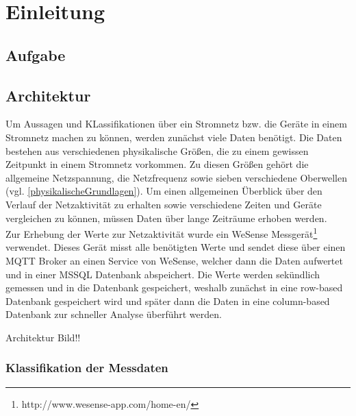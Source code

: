 \chapter{Einleitung}

\section{Aufgabe}

\section{Architektur}

    Um Aussagen und KLassifikationen über ein Stromnetz bzw. die Geräte in einem Stromnetz machen zu können, werden zunächst viele Daten benötigt.
    Die Daten bestehen aus verschiedenen physikalische Größen, die zu einem gewissen Zeitpunkt in einem Stromnetz vorkommen.
    Zu diesen Größen gehört die allgemeine Netzspannung, die Netzfrequenz sowie sieben verschiedene Oberwellen (vgl. \ref{physikalischeGrundlagen}).
    Um einen allgemeinen Überblick über den Verlauf der Netzaktivität zu erhalten sowie verschiedene Zeiten und Geräte vergleichen zu können, müssen Daten über lange Zeiträume erhoben werden.\\
    \newline
    Zur Erhebung der Werte zur Netzaktivität wurde ein WeSense Messgerät\footnote{http://www.wesense-app.com/home-en/} verwendet.
    Dieses Gerät misst alle benötigten Werte und sendet diese über einen MQTT Broker an einen Service von WeSense, welcher dann die Daten aufwertet und in einer MSSQL Datenbank abspeichert.
    Die Werte werden sekündlich gemessen und in die Datenbank gespeichert, weshalb zunächst in eine row-based Datenbank gespeichert wird und später dann die Daten in eine column-based Datenbank zur schneller Analyse überführt werden.
    \newline

    Architektur Bild!!

    \subsection{Klassifikation der Messdaten}